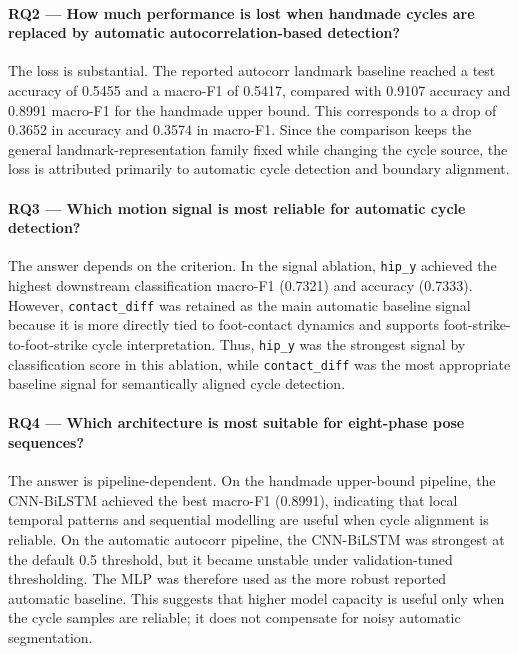\paragraph{RQ2 --- How much performance is lost when handmade cycles are
replaced by automatic autocorrelation-based detection?}
The loss is substantial. The reported autocorr landmark baseline reached a test
accuracy of 0.5455 and a macro-F1 of 0.5417, compared with 0.9107 accuracy and
0.8991 macro-F1 for the handmade upper bound. This corresponds to a drop of
0.3652 in accuracy and 0.3574 in macro-F1. Since the comparison keeps the
general landmark-representation family fixed while changing the cycle source,
the loss is attributed primarily to automatic cycle detection and boundary
alignment.

\paragraph{RQ3 --- Which motion signal is most reliable for automatic cycle
detection?}
The answer depends on the criterion. In the signal ablation, \texttt{hip\_y}
achieved the highest downstream classification macro-F1 (0.7321) and accuracy
(0.7333). However, \texttt{contact\_diff} was retained as the main automatic
baseline signal because it is more directly tied to foot-contact dynamics and
supports foot-strike-to-foot-strike cycle interpretation. Thus, \texttt{hip\_y}
was the strongest signal by classification score in this ablation, while
\texttt{contact\_diff} was the most appropriate baseline signal for
semantically aligned cycle detection.

\paragraph{RQ4 --- Which architecture is most suitable for eight-phase pose
sequences?}
The answer is pipeline-dependent. On the handmade upper-bound pipeline, the
CNN-BiLSTM achieved the best macro-F1 (0.8991), indicating that local temporal
patterns and sequential modelling are useful when cycle alignment is reliable.
On the automatic autocorr pipeline, the CNN-BiLSTM was strongest at the default
0.5 threshold, but it became unstable under validation-tuned thresholding. The
MLP was therefore used as the more robust reported automatic baseline. This
suggests that higher model capacity is useful only when the cycle samples are
reliable; it does not compensate for noisy automatic segmentation.

